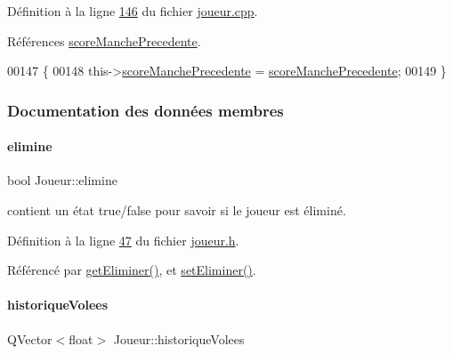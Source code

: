 Définition à la ligne \hyperlink{joueur_8cpp_source_l00146}{146} du fichier \hyperlink{joueur_8cpp_source}{joueur.\+cpp}.



Références \hyperlink{joueur_8h_source_l00045}{score\+Manche\+Precedente}.


\begin{DoxyCode}
00147 \{
00148     this->\hyperlink{class_joueur_ac78f2e83781d2bdeb9a613dc37812736}{scoreManchePrecedente} = \hyperlink{class_joueur_ac78f2e83781d2bdeb9a613dc37812736}{scoreManchePrecedente};
00149 \}
\end{DoxyCode}


\subsubsection{Documentation des données membres}
\mbox{\label{class_joueur_acac733012102f81d05b0a4c0801fcf61}} 
\paragraph{\texorpdfstring{elimine}{elimine}}
{\footnotesize\ttfamily bool Joueur\+::elimine\hspace{0.3cm}{\ttfamily [private]}}



contient un état true/false pour savoir si le joueur est éliminé. 



Définition à la ligne \hyperlink{joueur_8h_source_l00047}{47} du fichier \hyperlink{joueur_8h_source}{joueur.\+h}.



Référencé par \hyperlink{joueur_8cpp_source_l00101}{get\+Eliminer()}, et \hyperlink{joueur_8cpp_source_l00112}{set\+Eliminer()}.

\mbox{\label{class_joueur_aeb24d1e8125a7bf302167b91a945687e}} 
\paragraph{\texorpdfstring{historique\+Volees}{historiqueVolees}}
{\footnotesize\ttfamily Q\+Vector$<$float$>$ Joueur\+::historique\+Volees\hspace{0.3cm}{\ttfamily [private]}}



